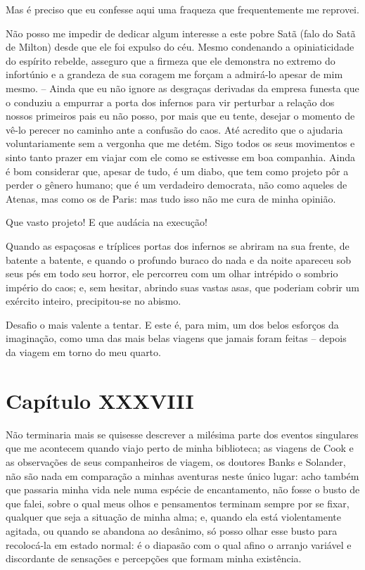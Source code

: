  Mas é preciso que eu confesse aqui uma fraqueza que frequentemente me reprovei. 

 Não posso me impedir de dedicar algum interesse a este pobre Satã (falo
do Satã de Milton) desde que ele foi expulso do céu. Mesmo condenando a
opiniaticidade do espírito rebelde, asseguro que a firmeza que ele
demonstra no extremo do infortúnio e a grandeza de sua coragem me
forçam a admirá-lo apesar de mim mesmo. -- Ainda que eu não ignore as
desgraças derivadas da empresa funesta que o conduziu a empurrar a
porta dos infernos para vir perturbar a relação dos nossos primeiros
pais eu não posso, por mais que eu tente, desejar o momento de vê-lo
perecer no caminho ante a confusão do caos. Até acredito que o ajudaria
voluntariamente sem a vergonha que me detém. Sigo todos os seus
movimentos e sinto tanto prazer em viajar com ele como se estivesse em
boa companhia. Ainda é bom considerar que, apesar de tudo, é um diabo,
que tem como projeto pôr a perder o gênero humano; que é um verdadeiro
democrata, não como aqueles de Atenas, mas como os de Paris: mas tudo
isso não me cura de minha opinião.

 Que vasto projeto! E que audácia na execução!

 Quando as espaçosas e tríplices portas dos infernos se abriram na sua
frente, de batente a batente, e quando o profundo buraco do nada e da
noite apareceu sob seus pés em todo seu horror, ele percorreu com um
olhar intrépido o sombrio império do caos; e, sem hesitar, abrindo suas
vastas asas, que poderiam cobrir um exército inteiro, precipitou-se no
abismo.

 Desafio o mais valente a tentar. E este é, para mim, um dos belos
esforços da imaginação, como uma das mais belas viagens que jamais
foram feitas -- depois da viagem em torno do meu quarto.

\section{Capítulo XXXVIII}

 Não terminaria mais se quisesse descrever a milésima parte dos eventos
singulares que me acontecem quando viajo perto de minha biblioteca; as
viagens de Cook e as observações de seus companheiros de viagem, os
doutores Banks e Solander, não são nada em comparação a minhas
aventuras neste único lugar: acho também que passaria minha vida nele
numa espécie de encantamento, não fosse o busto de que falei, sobre o
qual meus olhos e pensamentos terminam sempre por se fixar, qualquer
que seja a situação de minha alma; e, quando ela está violentamente
agitada, ou quando se abandona ao desânimo, só posso olhar esse busto
para recolocá-la em estado normal: é o diapasão com o qual afino o
arranjo variável e discordante de sensações e percepções que formam
minha existência. 

